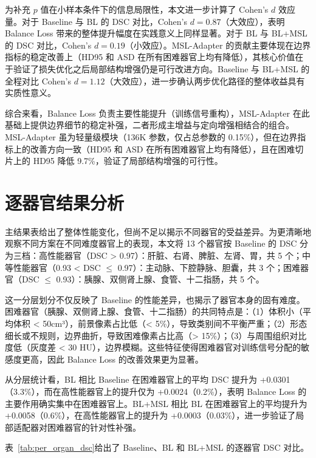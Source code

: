 为补充 $p$ 值在小样本条件下的信息局限性，本文进一步计算了 Cohen's $d$ 效应量。对于 Baseline 与 BL 的 DSC 对比，Cohen's $d = 0.87$（大效应），表明 Balance Loss 带来的整体提升幅度在实践意义上同样显著。对于 BL 与 BL+MSL 的 DSC 对比，Cohen's $d = 0.19$（小效应）。MSL-Adapter 的贡献主要体现在边界指标的稳定改善上（HD95 和 ASD 在所有困难器官上均有降低），其核心价值在于验证了损失优化之后局部结构增强仍是可行改进方向。Baseline 与 BL+MSL 的全程对比 Cohen's $d = 1.12$（大效应），进一步确认两步优化路径的整体收益具有实质性意义。

综合来看，Balance Loss 负责主要性能提升（训练信号重构），MSL-Adapter 在此基础上提供边界细节的稳定补强，二者形成主增益与定向增强相结合的组合。MSL-Adapter 虽为轻量级模块（136K 参数，仅占总参数的 0.15\%），但在边界指标上的改善方向一致（HD95 和 ASD 在所有困难器官上均有降低），且在困难切片上的 HD95 降低 9.7\%，验证了局部结构增强的可行性。

\section{逐器官结果分析}

主结果表给出了整体性能变化，但尚不足以揭示不同器官的受益差异。为更清晰地观察不同方案在不同难度器官上的表现，本文将 13 个器官按 Baseline 的 DSC 分为三档：高性能器官（DSC > 0.97）：肝脏、右肾、脾脏、左肾、胃，共 5 个；中等性能器官（0.93 < DSC $\leq$ 0.97）：主动脉、下腔静脉、胆囊，共 3 个；困难器官（DSC $\leq$ 0.93）：胰腺、双侧肾上腺、食管、十二指肠，共 5 个。

这一分层划分不仅反映了 Baseline 的性能差异，也揭示了器官本身的固有难度。困难器官（胰腺、双侧肾上腺、食管、十二指肠）的共同特点是：（1）体积小（平均体积 < 50cm³），前景像素占比低（< 5\%），导致类别间不平衡严重；（2）形态细长或不规则，边界曲折，导致困难像素占比高（> 15\%）；（3）与周围组织对比度低（灰度差 < 30 HU），边界模糊。这些特征使得困难器官对训练信号分配的敏感度更高，因此 Balance Loss 的改善效果更为显著。

从分层统计看，BL 相比 Baseline 在困难器官上的平均 DSC 提升为 +0.0301（3.3\%），而在高性能器官上的提升仅为 +0.0024（0.2\%），表明 Balance Loss 的主要作用确实集中在困难器官上。BL+MSL 相比 BL 在困难器官上的平均提升为 +0.0058（0.6\%），在高性能器官上的提升为 +0.0003（0.03\%），进一步验证了局部适配器对困难器官的针对性补强。

表~\ref{tab:per_organ_dsc}给出了 Baseline、BL 和 BL+MSL 的逐器官 DSC 对比。

